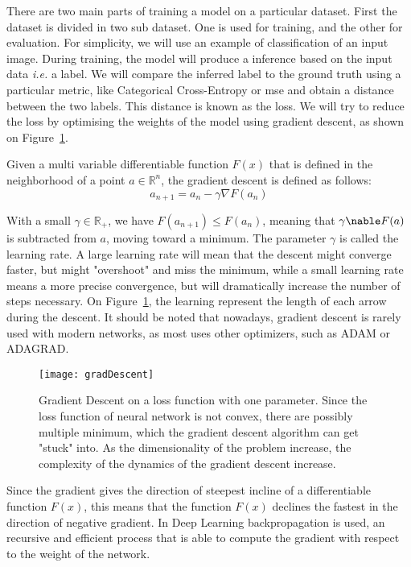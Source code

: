 There are two main parts of training a model on a particular dataset. First the dataset is divided in two sub dataset. One is used for training, and the other for evaluation. For simplicity, we will use an example of classification of an input image. During training, the model will produce a inference based on the input data \textit{i.e.} a label. We will compare the inferred label to the ground truth using a particular metric, like Categorical Cross-Entropy or \gls{mse} and obtain a distance between the two labels. This distance is known as the loss. We will try to reduce the loss by optimising the \gls{weights} of the model using gradient descent, as shown on Figure~\ref{fig:gradDesc}. 

Given a multi variable differentiable function $F(x)$ that is defined in the neighborhood of a point $a \in \mathbb{R}^n$, the gradient descent is defined as follows:
\begin{equation}
	a_{n+1} = a_n - \gamma \nabla F(a_n)
\end{equation}

With a small $\gamma \in \mathbb{R}_+$, we have $F(a_{n+1}) \leq F(a_n)$, meaning that $\gamma \nable F(a)$ is subtracted from $a$, moving toward a minimum. The parameter $\gamma$ is called the learning rate. A large learning rate will mean that the descent might converge faster, but might "overshoot" and miss the minimum, while a small learning rate means a more precise convergence, but will dramatically increase the number of steps necessary. On Figure~\ref{fig:gradDesc}, the learning represent the length of each arrow during the descent. It should be noted that nowadays, gradient descent is rarely used with modern networks, as most uses other optimizers, such as ADAM\cite{AdamOpti} or ADAGRAD\cite{adagrad}.

\begin{figure}[h!]
  \centering
  \texttt{[image: gradDescent]}
	\caption[Gradient Descent]{Gradient Descent on a loss function with one parameter. Since the loss function of neural network is not convex, there are possibly multiple minimum, which the gradient descent algorithm can get "stuck" into. As the dimensionality of the problem increase, the complexity of the dynamics of the gradient descent increase.}
  \label{fig:gradDesc}
\end{figure}

Since the gradient gives the direction of steepest incline of a differentiable function $F(x)$, this means that the function $F(x)$ declines the fastest in the direction of negative gradient. In Deep Learning backpropagation is used, an recursive and efficient process that is able to compute the gradient with respect to the weight of the network.

